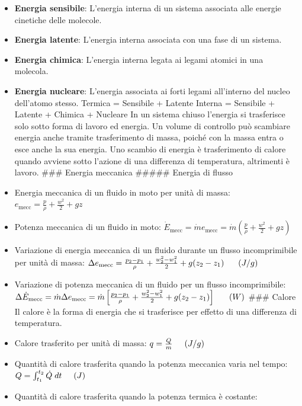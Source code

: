 \begin{itemize}
\item
  \textbf{Energia sensibile}: L'energia interna di un sistema associata
  alle energie cinetiche delle molecole.
\item
  \textbf{Energia latente}: L'energia interna associata con una fase di
  un sistema.
\item
  \textbf{Energia chimica}: L'energia interna legata ai legami atomici
  in una molecola.
\item
  \textbf{Energia nucleare}: L'energia associata ai forti legami
  all'interno del nucleo dell'atomo stesso. Termica = Sensibile +
  Latente Interna = Sensibile + Latente + Chimica + Nucleare In un
  sistema chiuso l'energia si trasferisce solo sotto forma di lavoro ed
  energia. Un volume di controllo può scambiare energia anche tramite
  trasferimento di massa, poiché con la massa entra o esce anche la sua
  energia. Uno scambio di energia è trasferimento di calore quando
  avviene sotto l'azione di una differenza di temperatura, altrimenti è
  lavoro. \#\#\# Energia meccanica \#\#\#\#\# Energia di flusso
\item
  Energia meccanica di un fluido in moto per unità di massa:
  \(e_\text{mecc}=\frac{p}{\rho}+\frac{w^2}{2}+gz\)
\item
  Potenza meccanica di un fluido in moto:
  \(\dot E_\text{mecc}=\dot me_\text{mecc}=\dot m\left(\frac{p}{\rho}+\frac{w^2}{2}+gz\right)\)
\item
  Variazione di energia meccanica di un fluido durante un flusso
  incomprimibile per unità di massa:
  \(\Delta e_\text{mecc}=\frac{p_2-p_1}{\rho}+\frac{w^2_2-w^2_1}{2}+g(z_2-z_1)\hspace{0.6cm}(J/g)\)
\item
  Variazione di potenza meccanica di un fluido per un flusso
  incomprimibile:
  \(\Delta \dot E_\text{mecc}=\dot m\Delta e_\text{mecc}=\dot m\left[\frac{p_2-p_1}{\rho}+\frac{w^2_2-w^2_1}{2}+g(z_2-z_1)\right]\hspace{0.6cm}(W)\)
  \#\#\# Calore Il calore è la forma di energia che si trasferisce per
  effetto di una differenza di temperatura.
\item
  Calore trasferito per unità di massa:
  \(q=\frac{Q}{m}\hspace{0.5cm}(J/g)\)
\item
  Quantità di calore trasferita quando la potenza meccanica varia nel
  tempo: \(Q=\int_{t_1}^{t_2}\dot Q\;dt\hspace{0.5cm}(J)\)
\item
  Quantità di calore trasferita quando la potenza termica è costante:

\end{itemize}
